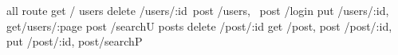 all route 
get /
users{
 delete /users/:id\
 post  /users,     \
 post /login 
 put /users/:id,
 get/users/:page
 post /searchU
}
posts{ 
 delete /post/:id
 get   /post,
 post /post/:id,
 put /post/:id,
post/searchP
}